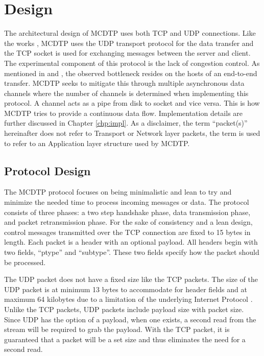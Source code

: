 \chapter{Design}

The architectural design of MCDTP uses both TCP and UDP connections. Like the works \cite{He2002,Fan2010,Aspera2016,Meiss2007}, MCDTP uses the UDP transport protocol for the data transfer and the TCP socket is used for exchanging messages between the server and client. The experimental component of this protocol is the lack of congestion control. As mentioned in \cite{Fan2010} and \cite{Aspera2016}, the observed bottleneck resides on the hosts of an end-to-end transfer. MCDTP seeks to mitigate this through multiple asynchronous data channels where the number of channels is determined when implementing this protocol. A channel acts as a pipe from disk to socket and vice versa. This is how MCDTP tries to provide a continuous data flow. Implementation details are further discussed in Chapter \ref{chp:impl}. As a disclaimer, the term ``packet(s)'' hereinafter does not refer to Transport or Network layer packets, the term is used to refer to an Application layer structure used by MCDTP.

\section{Protocol Design}\label{sec:proto-des}

The MCDTP protocol focuses on being minimalistic and lean to try and minimize the needed time to process incoming messages or data. The protocol consists of three phases: a two step handshake phase, data transmission phase, and packet retransmission phase. For the sake of consistency and a lean design, control messages transmitted over the TCP connection are fixed to 15 bytes in length. Each packet is a header with an optional payload. All headers begin with two fields, ``ptype'' and ``subtype''. These two fields specify how the packet should be processed.

The UDP packet does not have a fixed size like the TCP packets. The size of the UDP packet is at minimum 13 bytes to accommodate for header fields and at maximum 64 kilobytes due to a limitation of the underlying Internet Protocol \cite{postel1981ip}. Unlike the TCP packets, UDP packets include payload size with packet size. Since UDP has the option of a payload, when one exists, a second read from the stream will be required to grab the payload. With the TCP packet, it is guaranteed that a packet will be a set size and thus eliminates the need for a second read.

